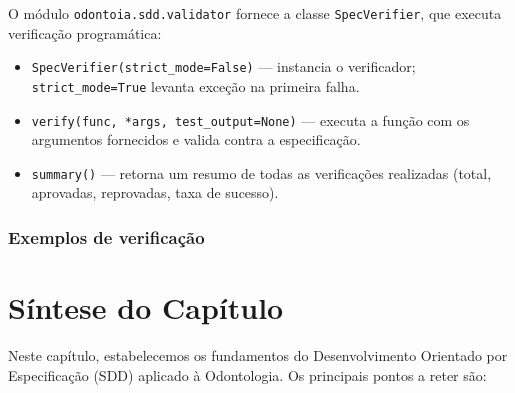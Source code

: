 O módulo \texttt{odontoia.sdd.validator} fornece a classe
\texttt{SpecVerifier}, que executa verificação programática:

\begin{itemize}
  \item \texttt{SpecVerifier(strict\_mode=False)} — instancia o
    verificador; \texttt{strict\_mode=True} levanta exceção na
    primeira falha.
  \item \texttt{verify(func, *args, test\_output=None)} — executa a
    função com os argumentos fornecidos e valida contra a especificação.
  \item \texttt{summary()} — retorna um resumo de todas as verificações
    realizadas (total, aprovadas, reprovadas, taxa de sucesso).
\end{itemize}

\subsubsection{Exemplos de verificação}



\section{Síntese do Capítulo}

Neste capítulo, estabelecemos os fundamentos do Desenvolvimento Orientado
por Especificação (SDD) aplicado à Odontologia. Os principais pontos
a reter são:

